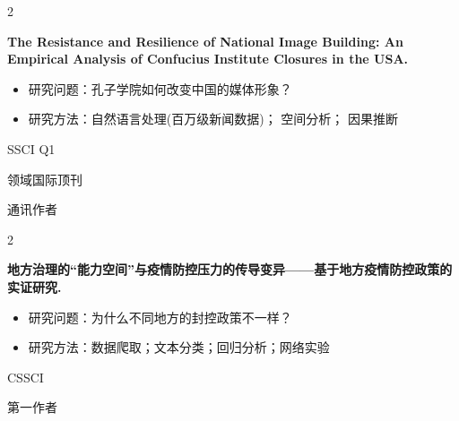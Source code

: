\documentclass[10pt, letterpaper]{article}
\newenvironment{twocolentry}[2][]{
    \onecolentry
    \def\secondColumn{#2}
    \setcolumnwidth{\fill, 2.5 cm}
    \begin{paracol}{2}
}{
    \switchcolumn \raggedleft \secondColumn
    \end{paracol}
    \endonecolentry
} %
\begin{document}
        \begin{twocolentry}{
            SSCI Q1

            领域国际顶刊
            
            通讯作者
        }
        \textbf{The Resistance and Resilience of National Image Building: An Empirical Analysis of Confucius Institute Closures in the USA.}
            \begin{itemize}[
                topsep=0.005cm,   %
                parsep=0.005cm,   %
                partopsep=0pt,    %
                itemsep=0pt,      %
                leftmargin=0cm + 10pt
            ]
            \item 研究问题：孔子学院如何改变中国的媒体形象？

            \item 研究方法：自然语言处理(百万级新闻数据)； 空间分析； 因果推断

            \end{itemize}
    
    
        \end{twocolentry}

        \vspace{0.01 cm}  %

        \vspace{0.15 cm}

        \begin{twocolentry}{
            CSSCI
            
            第一作者
        }
        \textbf{地方治理的“能力空间”与疫情防控压力的传导变异——基于地方疫情防控政策的实证研究.}

        \begin{itemize}[
            topsep=0.005cm,   %
            parsep=0.005cm,   %
            partopsep=0pt,    %
            itemsep=0pt,      %
            leftmargin=0cm + 10pt
        ]
        \item 研究问题：为什么不同地方的封控政策不一样？

        \item 研究方法：数据爬取；文本分类；回归分析；网络实验

        \end{itemize}

    \end{twocolentry}

    \vspace{0.15 cm}
\end{document}
